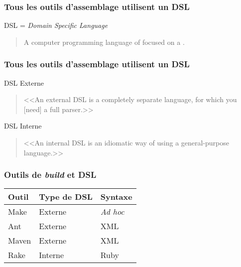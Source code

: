 \begin{frame}
\frametitle{Tous les outils d'assemblage utilisent un DSL}

\begin{block}{DSL = \emph{Domain Specific Language}}
\begin{quote}

A computer \alert{programming language} of
 focused on a
.

\bigskip

\end{quote}
\end{block}

\VF


\NOTE{\ }

\end{frame}

\begin{frame}
\frametitle{Tous les outils d'assemblage utilisent un DSL}

\begin{block}{DSL Externe}
\begin{quote}
<<An \alert{external DSL} is a completely separate language, for which
you [need] a full parser.>>
\end{quote}
\end{block}

\VF

\begin{block}{DSL Interne}
\begin{quote}
<<An \alert{internal DSL} is an idiomatic way of using a
general-purpose language.>>
\end{quote}

\end{block}


\VF


\NOTE{\ }

\end{frame}

\begin{frame}
\frametitle{Outils de \emph{build} et DSL}

\begin{center}
\begin{tabular}{||l|l|l||}\hline\hline
{\bf Outil} & {\bf Type de DSL} & {\bf Syntaxe}\\\hline\hline
Make & Externe &  \emph{Ad hoc}\\\hline
Ant & Externe &  XML\\\hline
Maven & Externe &  XML\\\hline
Rake & \alert{Interne} &  \alert{Ruby}\\\hline\hline
\end{tabular}
\end{center}

\NOTE{\ }

\end{frame}


